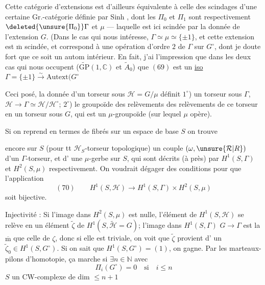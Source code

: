 Cette catégorie d'extensions est d'ailleurs équivalente
à celle des scindages d'une certaine
Gr.-catégorie définie par Sinh , dont les $\Pi_0$ et
$\Pi_1$ sont respectivement $\deleted{\unsure{\Pi_0}}\Gamma$ et $\mu$ --- laquelle
est  ici scindée par la donnée de l'extension
$G$. (Dans le cas qui nous intéresse,
$\Gamma\simeq\mu\simeq\{\pm1\}$, et
cette extension est $\overline{\mathrm m}$ scindée, et correspond
à une opération d'ordre $2$ de $\Gamma$ sur $G^\circ$,
dont je doute fort que ce soit un autom intérieur.
En fait, j'ai l'impression que dans les
deux cas qui nous occupent ($\widetilde{\mathrm{GP}}(1,\mathbb C)$ et
$\widetilde A_0$) que $(69)$ est un \uline{iso}
$\Gamma=\{\pm1\}\xrightarrow{\sim}\mathrm{Autext}(G^\circ$

Ceci posé, la donnée d'un torseur sous
$\mathcal H=G/\mu$ définit $1^\circ$) un torseur sous $\Gamma$,
$\mathcal H\longrightarrow\Gamma\simeq\mathcal H/\mathcal H^\circ$; $2^\circ$) le groupoïde des
relèvements des relèvements de ce torseur
en un torseur sous $G$, qui est un
$\mu$-groupoïde  (sur lequel $\mu$ opère).

Si on  reprend en termes de fibrés
sur un espace de base $S$ on trouve

encore sur $S$ (pour tt $\mathcal H_S$-torseur topologique)
un couple $(\omega,\unsure{\mathcal R|R})$ d'un $\Gamma$-torseur, et d'
une $\mu$-gerbe sur $S$, qui sont décrits (à 
 près) par $H^1(S,\Gamma)$ et $H^2(S,\mu)$
respectivement. On voudrait dégager des
conditions  pour que l'application
\[
(70)\qquad H^1(S,\mathcal H)\longrightarrow H^1(S,\Gamma)\times H^2(S,\mu)
\]
soit bijective.

Injectivité : Si l'image 
dans $H^2(S,\mu)$ est nulle,
l'élément de $H^1(S,\mathcal H)$ se relève en un élément $\widetilde\zeta$
de $H^1(S,\widetilde{\mathcal H}=G)$;  l'image dans $H^1(S,\Gamma)$
 $G\longrightarrow\Gamma$ est la $\overline{\mathrm m}$ que celle de $\zeta$, donc si
elle est triviale, on voit que $\widetilde\zeta$ provient d'
un $\widetilde\zeta_0\in H^1(S,G^\circ)$. Si on sait que
$H^1(S,G^\circ)=(1)$, on gagne. Par les
marteaux-pilons d'homotopie, ça marche
si $\exists n\in\mathbb N$ avec
\[
\Pi_i(G^\circ)=0\quad\text{si}\quad i\leq n
\]
$S$ un CW-complexe de dim $\leq n+1$

